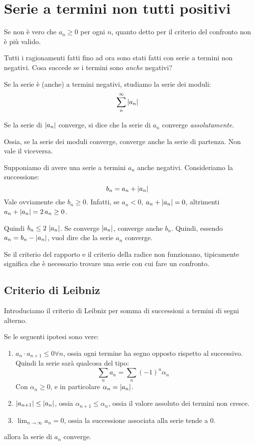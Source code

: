 
\section{Serie a termini non tutti positivi}

Se non \`e vero che $a_n \ge 0$ per ogni $n$, quanto detto per il criterio del confronto non \`e pi\`u valido.

Tutti i ragionamenti fatti fino ad ora sono stati fatti con serie a termini non negativi. Cosa succede se i termini sono \emph{anche} negativi?

Se la serie \`e (anche) a termini negativi, studiamo la serie dei moduli:
\[
\sum_{n}^{\infty} \left\lvert{a_n}\right\rvert
\]
\begin{defn}
Se la serie di $\left\lvert{a_n}\right\rvert$ converge, si dice che la serie di $a_n$ converge \emph{assolutamente}.

Ossia, se la serie dei moduli converge, converge anche la serie di partenza. Non vale il viceversa.
\end{defn}

Supponiamo di avere una serie a termini $a_n$ anche negativi. Consideriamo la successione:
\[
b_n = a_n + \left\lvert{a_n}\right\rvert
\]
Vale ovviamente che $b_n \ge 0$. Infatti, se $a_n < 0$, $a_n + \left\lvert{a_n}\right\rvert = 0$, altrimenti $a_n + \left\lvert{a_n}\right\rvert = 2 \, a_n \ge 0$.

Quindi $b_n \le 2 \, \left\lvert{a_n}\right\rvert$. Se converge $\left\lvert{a_n}\right\rvert$, converge anche $b_n$. Quindi, essendo $a_n = b_n - \left\lvert{a_n}\right\rvert$, vuol dire che la serie $a_n$ converge.

Se il criterio del rapporto e il criterio della radice non funzionano, tipicamente significa che \`e necessario trovare una serie con cui fare un confronto.

\subsection{Criterio di Leibniz}

Introduciamo il criterio di Leibniz per somma di successioni a termini di segni alterno. 

\begin{theorem}
Se le seguenti ipotesi sono vere:
\begin{enumerate}
    \item $a_n \cdot a_{n+1} \le 0 \forall n$, ossia ogni termine ha segno opposto rispetto al successivo. Quindi la serie sar\`a qualcosa del tipo:
    \[
    \sum_{n} a_n = \sum_{n} (-1)^n \alpha_n
    \]
    Con $\alpha_n \ge 0$, e in particolare $\alpha_n = \left\lvert{a_n}\right\rvert$.
    \item $\left\lvert{a_{n+1}}\right\rvert \le \left\lvert{a_n}\right\rvert$, ossia $\alpha_{n+1} \le \alpha_{n}$, ossia il valore assoluto dei termini non cresce.
    \item $\lim_{n \to \infty} a_n = 0$, ossia la successione associata alla serie tende a 0.
\end{enumerate}
allora la serie di $a_n$ converge.
\end{theorem}


